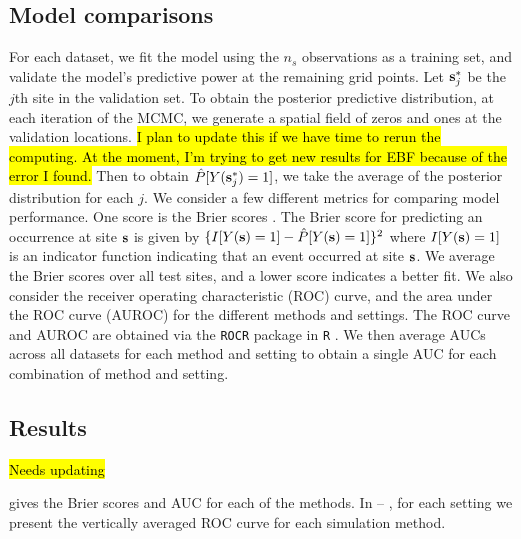 \documentclass[11pt]{article}
\begin{document}
\subsection{Model comparisons}\label{rbs:cv}
For each dataset, we fit the model using the $n_s$ observations as a training set, and validate the model's predictive power at the remaining grid points.
Let $\mbox{\bf s}^*_j$ be the $j$th site in the validation set.
To obtain the posterior predictive distribution, at each iteration of the MCMC, we generate a spatial field of zeros and ones at the validation locations.
\hl{I plan to update this if we have time to rerun the computing. At the moment, I'm trying to get new results for EBF because of the error I found.}
Then to obtain $\hat{P}[Y(\mbox{\bf s}^*_j) = 1]$, we take the average of the posterior distribution for each $j$.
We consider a few different metrics for comparing model performance.
One score is the Brier scores \citep[BS]{Gneiting2007}.
The Brier score for predicting an occurrence at site $\mbox{\bf s}$ is given by $\{I[Y(\mbox{\bf s})=1] - \hat{P}[Y(\mbox{\bf s})=1]\}^2$ where $I[Y(\mbox{\bf s}) = 1]$ is an indicator function indicating that an event occurred at site $\mbox{\bf s}$.
We average the Brier scores over all test sites, and a lower score indicates a better fit.
We also consider the receiver operating characteristic (ROC) curve, and the area under the ROC curve (AUROC) for the different methods and settings.
The ROC curve and AUROC are obtained via the \texttt{ROCR} \citep{Sing2005} package in \texttt{R} \citep{Rmanual}.
We then average AUCs across all datasets for each method and setting to obtain a single AUC for each combination of method and setting.

\subsection{Results} \label{rbs:simresults}
\hl{Needs updating}

 gives the Brier scores and AUC for each of the methods.
In  -- , for each setting we present the vertically averaged ROC curve for each simulation method.
\end{document}
